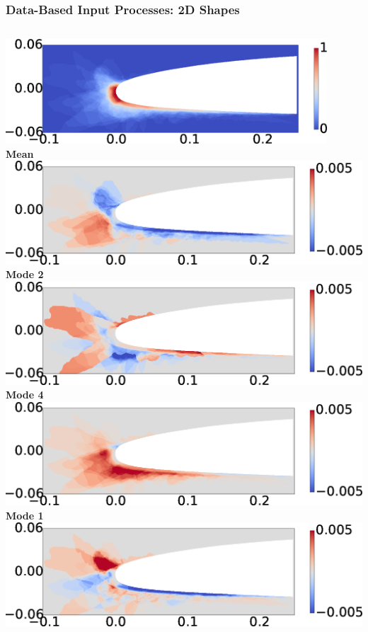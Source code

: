 \documentclass[9pt]{beamer}
\begin{document}
\begin{frame}
\frametitle{Data-Based Input Processes: 2D Shapes}
\label{sec-2-6}


\begin{columns}[c]
    \centering
    \hspace{-2.17em}
    \includegraphics[width=0.9\textwidth]{MEAN.png} \\
    {\bf Mean} \\
    \includegraphics[width=1\textwidth]{MODE2.png} \\
    {\bf Mode 2} \\
    \includegraphics[width=1\textwidth]{MODE4.png} \\
    {\bf Mode 4}
    \centering
    \includegraphics[width=1\textwidth]{MODE1.png} \\
    {\bf Mode 1} \\
    \includegraphics[width=1\textwidth]{MODE3.png} \\

\end{columns}
\end{frame}
\end{document}

